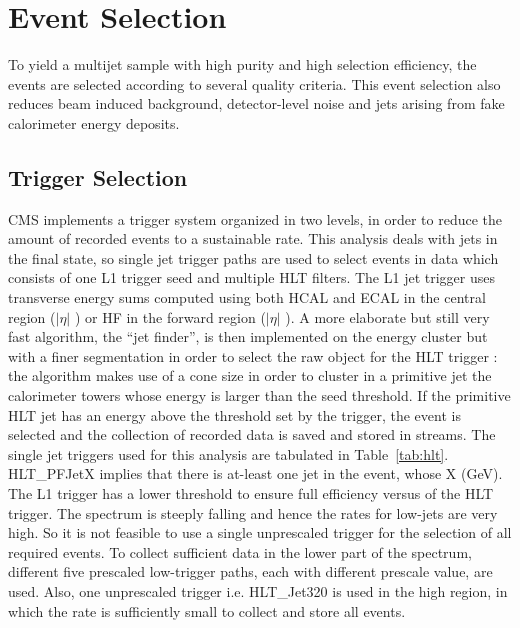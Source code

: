 \section{Event Selection}
To yield a multijet sample with high purity and high selection efficiency, the events are selected according to several quality criteria. This event selection also reduces beam induced background, detector-level noise and jets arising from fake calorimeter energy deposits. 

\subsection{Trigger Selection}

CMS implements a trigger system organized in two levels, in order to reduce the amount of recorded events to a sustainable rate. This analysis deals with jets in the final state, so single jet trigger paths are used to select events in data which consists of one L1 trigger seed and multiple HLT filters. The L1 jet trigger uses transverse energy sums computed using both HCAL and ECAL in the central region ($|\eta|$ ) or HF in the forward region ($|\eta|$ ). A more elaborate but still very fast algorithm, the ``jet finder'', is then implemented on the energy cluster but with a finer segmentation in order to select the raw object for the HLT trigger :  the algorithm makes use of a cone size in order to cluster in a primitive jet the calorimeter towers whose energy is larger than the seed threshold. If the primitive HLT jet has an energy above the threshold set by the trigger, the event is selected and the collection of recorded data is saved and stored in streams.  The single jet triggers used for this analysis are tabulated in Table~\ref{tab:hlt}. HLT\_PFJetX implies that there is at-least one jet in the event, whose \pt \gr X (GeV). The L1 trigger has a lower threshold to ensure full efficiency versus \pt of the HLT trigger. The \pt spectrum is steeply falling and hence the rates for low-\pt jets are very high. So it is not feasible to use a single unprescaled trigger for the selection of all required events. To collect sufficient data in the lower part of the \pt spectrum, different five prescaled low-\pt trigger paths, each with different prescale value, are used. Also, one unprescaled trigger i.e. HLT\_Jet320 is used in the high \pt region, in which the rate is sufficiently small to collect and store all events. 

